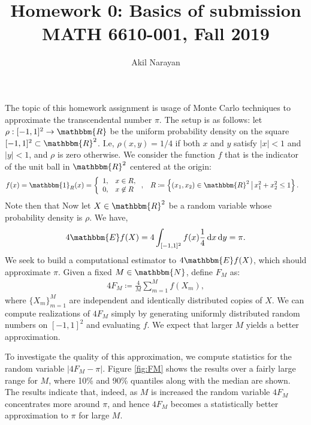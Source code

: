 \documentclass[11pt]{amsart}
\newcommand{\E}{\mathbbm{E}}
\newcommand{\R}{\mathbbm{R}}
\newcommand{\N}{\mathbbm{N}}
\newcommand{\mathd}{\mathrm{d}}
\newcommand{\dx}[1]{\,\mathd #1}
\begin{document}
\title{Homework 0: Basics of submission\\MATH 6610-001, Fall 2019}
\author{Akil Narayan}
\maketitle

The topic of this homework assignment is usage of Monte Carlo techniques to approximate the transcendental number $\pi$.  The setup is as follows: let $\rho : [-1,1]^2 \rightarrow \R$ be the uniform probability density on the square $[-1,1]^2 \subset \R^2$. I.e, $\rho(x,y) = 1/4$ if both $x$ and $y$ satisfy $|x| < 1$ and $|y| < 1$, and $\rho$ is zero otherwise. We consider the function $f$ that is the indicator of the unit ball in $\R^2$ centered at the origin:
\begin{align*}
  f(x) &= \mathbbm{1}_R(x) = \left\{ \begin{array}{rl} 1, & x \in R, \\ 0, & x \not\in R \end{array}\right.,
       & 
     R &\coloneqq \left\{ (x_1, x_2) \in \R^2\, \big|\, x_1^2 + x_2^2 \leq 1 \right\}.
\end{align*}
Note then that 
Now let $X \in \R^2$ be a random variable whose probability density is $\rho$. We have,
\begin{align*}
  4 \E f(X) = 4 \int_{[-1,1]^2} f(x) \frac{1}{4} \dx{x} \dx{y} = \pi.
\end{align*}
We seek to build a computational estimator to $4 \E f(X)$, which should approximate $\pi$. Given a fixed $M \in \N$, define $F_M$ as:
\begin{align}\label{eq:FM-def}
  4 F_M \coloneqq \frac{4}{M} \sum_{m=1}^M f(X_m),
\end{align}
where $\{X_m\}_{m=1}^M$ are independent and identically distributed copies of $X$. We can compute realizations of $4 F_M$ simply by generating uniformly distributed random numbers on $[-1,1]^2$ and evaluating $f$. We expect that larger $M$ yields a better approximation.

To investigate the quality of this approximation, we compute statistics for the random variable $\left| 4 F_M - \pi \right|$. Figure \ref{fig:FM} shows the results over a fairly large range for $M$, where 10\% and 90\% quantiles along with the median are shown. The results indicate that, indeed, as $M$ is increased the random variable $4 F_M$ concentrates more around $\pi$, and hence $4 F_M$ becomes a statistically better approximation to $\pi$ for large $M$. 
\end{document}
